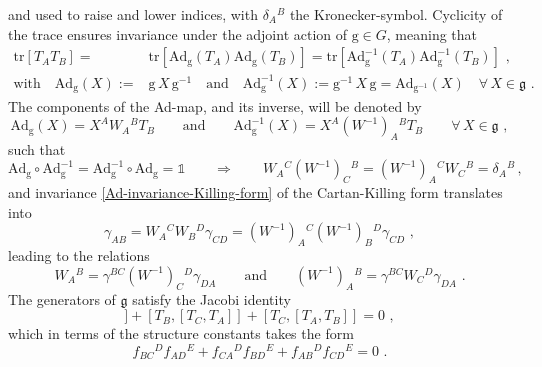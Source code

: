\documentclass[12pt]{article}
\numberwithin{equation}{section}
\begin{document}
and used to raise and lower indices, with $\delta_{A}{}^{B}$ the Kronecker-symbol.
Cyclicity of the trace ensures invariance under the adjoint action of $\mathrm{g}\in G$, meaning that
\begin{equation}\label{Ad-invariance-Killing-form}
\begin{aligned}
\mathrm{tr}[T_{A}T_{B}]=&\mathrm{tr}[\mathrm{Ad}_{\mathrm{g}}(T_{A})\mathrm{Ad}_{\mathrm{g}}(T_{B})] =\mathrm{tr}[\mathrm{Ad}_{\mathrm{g}}^{-1}(T_{A})\mathrm{Ad}_{\mathrm{g}}^{-1}(T_{B})] \,\, ,
\\
\text{with} \quad
\mathrm{Ad}_{\mathrm{g}}(X):=&\mathrm{g} \, X \, \mathrm{g}^{-1} 
\quad  \text{and}   \quad
\mathrm{Ad}_{\mathrm{g}}^{-1}(X):=\mathrm{g}^{-1} \, X \, \mathrm{g}=\mathrm{Ad}_{\mathrm{g}^{-1}}(X) 
\quad \forall \, X\in \mathfrak{g} \,\, .
\end{aligned}
\end{equation}
The components of the Ad-map, and its inverse, will be denoted by
\begin{equation}
\mathrm{Ad}_{\mathrm{g}}(X)=X^{A}W_{A}{}^{B}T_{B}
\qquad \text{and} \qquad
\mathrm{Ad}_{\mathrm{g}}^{-1}(X)=X^{A}(W^{-1})_{A}{}^{B}T_{B}
\qquad 
\forall \, X\in \mathfrak{g} \,\, ,
\end{equation}
such that
\begin{equation}
\mathrm{Ad}_{\mathrm{g}}\circ \mathrm{Ad}_{\mathrm{g}}^{-1}=\mathrm{Ad}_{\mathrm{g}}^{-1}\circ \mathrm{Ad}_{\mathrm{g}}= \mathbb{1} 
\qquad \Rightarrow \qquad
W_{A}{}^{C}(W^{-1})_{C}{}^{B}=(W^{-1})_{A}{}^{C}W_{C}{}^{B}=\delta_{A}{}^{B} \, ,
\end{equation}
and invariance \eqref{Ad-invariance-Killing-form} of the Cartan-Killing form translates into
\begin{equation}
\gamma_{AB} = W_{A}{}^{C}W_{B}{}^{D}\gamma_{CD} = (W^{-1})_{A}{}^{C}(W^{-1})_{B}{}^{D}\gamma_{CD} \,\, ,
\end{equation}
leading to the relations
\begin{equation}
W_{A}{}^{B}=\gamma^{BC}(W^{-1})_{C}{}^{D}\gamma_{DA}
\qquad \text{and} \qquad 
(W^{-1})_{A}{}^{B}=\gamma^{BC}W_{C}{}^{D}\gamma_{DA} \,\, .
\end{equation}
The generators of $\mathfrak{g}$ satisfy the Jacobi identity
\begin{equation}
[T_{A},[T_{B},T_{C}]]+[T_{B},[T_{C},T_{A}]]+[T_{C},[T_{A},T_{B}]]=0 \,\, ,
\end{equation}
which in terms of the structure constants takes the form
\begin{equation}\label{def-Jacobi-components}
f_{BC}{}^{D}f_{AD}{}^{E}+f_{CA}{}^{D}f_{BD}{}^{E}+f_{AB}{}^{D}f_{CD}{}^{E}=0 \,\, .
\end{equation}
\end{document}
